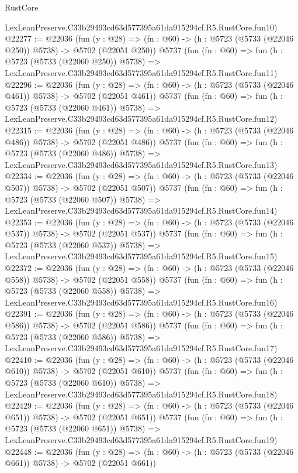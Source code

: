 \begin{lexlean}{RustCore}
\begin{coremodule}
    LexLeanPreserve.C33b29493cd63d577395a61da915294cf.R5.RustCore.fun10)
@22277 := @22036
    (fun (y : @28) => (fn : @60) -> (h : @5723 (@5733 (@22046 @250)) @5738) -> @5702 (@22051 @250))
    @5737
    (fun (fn : @60) =>
    fun (h : @5723 (@5733 (@22060 @250)) @5738) =>
    LexLeanPreserve.C33b29493cd63d577395a61da915294cf.R5.RustCore.fun11)
@22296 := @22036
    (fun (y : @28) => (fn : @60) -> (h : @5723 (@5733 (@22046 @461)) @5738) -> @5702 (@22051 @461))
    @5737
    (fun (fn : @60) =>
    fun (h : @5723 (@5733 (@22060 @461)) @5738) =>
    LexLeanPreserve.C33b29493cd63d577395a61da915294cf.R5.RustCore.fun12)
@22315 := @22036
    (fun (y : @28) => (fn : @60) -> (h : @5723 (@5733 (@22046 @486)) @5738) -> @5702 (@22051 @486))
    @5737
    (fun (fn : @60) =>
    fun (h : @5723 (@5733 (@22060 @486)) @5738) =>
    LexLeanPreserve.C33b29493cd63d577395a61da915294cf.R5.RustCore.fun13)
@22334 := @22036
    (fun (y : @28) => (fn : @60) -> (h : @5723 (@5733 (@22046 @507)) @5738) -> @5702 (@22051 @507))
    @5737
    (fun (fn : @60) =>
    fun (h : @5723 (@5733 (@22060 @507)) @5738) =>
    LexLeanPreserve.C33b29493cd63d577395a61da915294cf.R5.RustCore.fun14)
@22353 := @22036
    (fun (y : @28) => (fn : @60) -> (h : @5723 (@5733 (@22046 @537)) @5738) -> @5702 (@22051 @537))
    @5737
    (fun (fn : @60) =>
    fun (h : @5723 (@5733 (@22060 @537)) @5738) =>
    LexLeanPreserve.C33b29493cd63d577395a61da915294cf.R5.RustCore.fun15)
@22372 := @22036
    (fun (y : @28) => (fn : @60) -> (h : @5723 (@5733 (@22046 @558)) @5738) -> @5702 (@22051 @558))
    @5737
    (fun (fn : @60) =>
    fun (h : @5723 (@5733 (@22060 @558)) @5738) =>
    LexLeanPreserve.C33b29493cd63d577395a61da915294cf.R5.RustCore.fun16)
@22391 := @22036
    (fun (y : @28) => (fn : @60) -> (h : @5723 (@5733 (@22046 @586)) @5738) -> @5702 (@22051 @586))
    @5737
    (fun (fn : @60) =>
    fun (h : @5723 (@5733 (@22060 @586)) @5738) =>
    LexLeanPreserve.C33b29493cd63d577395a61da915294cf.R5.RustCore.fun17)
@22410 := @22036
    (fun (y : @28) => (fn : @60) -> (h : @5723 (@5733 (@22046 @610)) @5738) -> @5702 (@22051 @610))
    @5737
    (fun (fn : @60) =>
    fun (h : @5723 (@5733 (@22060 @610)) @5738) =>
    LexLeanPreserve.C33b29493cd63d577395a61da915294cf.R5.RustCore.fun18)
@22429 := @22036
    (fun (y : @28) => (fn : @60) -> (h : @5723 (@5733 (@22046 @651)) @5738) -> @5702 (@22051 @651))
    @5737
    (fun (fn : @60) =>
    fun (h : @5723 (@5733 (@22060 @651)) @5738) =>
    LexLeanPreserve.C33b29493cd63d577395a61da915294cf.R5.RustCore.fun19)
@22448 := @22036
    (fun (y : @28) => (fn : @60) -> (h : @5723 (@5733 (@22046 @661)) @5738) -> @5702 (@22051 @661))

\end{coremodule}
\end{lexlean}
